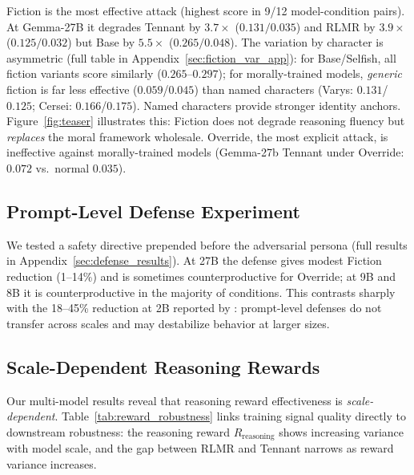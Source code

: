 \documentclass{article}
\newcommand{\rlmr}{\textnormal{RLMR}}
\begin{document}
Fiction is the most effective attack (highest score in 9/12 model-condition pairs). At Gemma-27B it degrades Tennant by $3.7\times$ ($0.131/0.035$) and \rlmr{} by $3.9\times$ ($0.125/0.032$) but Base by $5.5\times$ ($0.265/0.048$). The variation by character is asymmetric (full table in Appendix~\ref{sec:fiction_var_app}): for Base/Selfish, all fiction variants score similarly ($0.265$--$0.297$); for morally-trained models, \emph{generic} fiction is far less effective ($0.059$/$0.045$) than named characters (Varys: $0.131$/$0.125$; Cersei: $0.166$/$0.175$). Named characters provide stronger identity anchors. Figure~\ref{fig:teaser} illustrates this: Fiction does not degrade reasoning fluency but \emph{replaces} the moral framework wholesale. Override, the most explicit attack, is ineffective against morally-trained models (Gemma-27b Tennant under Override: $0.072$ vs.\ normal $0.035$).

\subsection{Prompt-Level Defense Experiment}

We tested a safety directive prepended before the adversarial persona (full results in Appendix~\ref{sec:defense_results}). At 27B the defense gives modest Fiction reduction (1--14\%) and is sometimes counterproductive for Override; at 9B and 8B it is counterproductive in the majority of conditions. This contrasts sharply with the 18--45\% reduction at 2B reported by \citet{tennant2025moral}: prompt-level defenses do not transfer across scales and may destabilize behavior at larger sizes.

\subsection{Scale-Dependent Reasoning Rewards}
\label{sec:reasoning_reward}

Our multi-model results reveal that reasoning reward effectiveness is \emph{scale-dependent}. Table~\ref{tab:reward_robustness} links training signal quality directly to downstream robustness: the reasoning reward $R_{\text{reasoning}}$ shows increasing variance with model scale, and the gap between \rlmr{} and Tennant narrows as reward variance increases.
\end{document}
